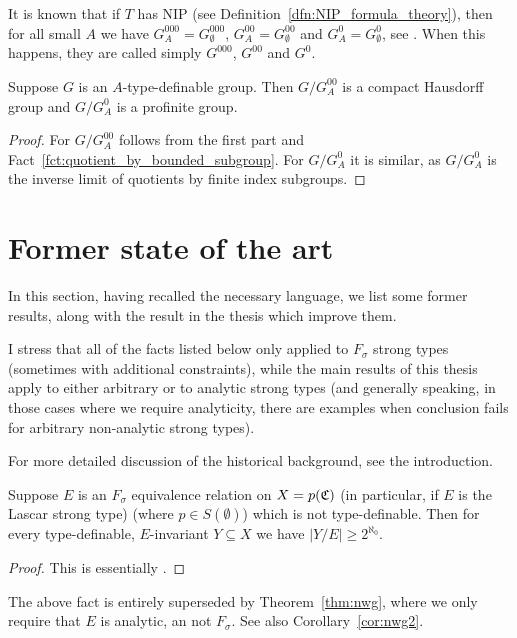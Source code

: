 	\begin{rem}
		It is known that if $T$ has NIP (see Definition~\ref{dfn:NIP_formula_theory}), then for all small $A$ we have $G^{000}_A=G^{000}_\emptyset$, $G^{00}_A=G^{00}_\emptyset$ and $G^{0}_A=G^{0}_\emptyset$, see \cite{Gis11}. When this happens, they are called simply $G^{000}$, $G^{00}$ and $G^{0}$.\xqed{\lozenge}
	\end{rem}
	
	
	\begin{fct}
		Suppose $G$ is an $A$-type-definable group. Then $G/G^{00}_A$ is a compact Hausdorff group and $G/G^{0}_A$ is a profinite group.
	\end{fct}
	\begin{proof}
		For $G/G^{00}_A$ follows from the first part and Fact~\ref{fct:quotient_by_bounded_subgroup}. For $G/G^{0}_A$ it is similar, as $G/G^{0}_A$ is the inverse limit of quotients by finite index subgroups.
	\end{proof}
	
	\section{Former state of the art}
	In this section, having recalled the necessary language, we list some former results, along with the result in the thesis which improve them.
	
	I stress that all of the facts listed below only applied to $F_\sigma$ strong types (sometimes with additional constraints), while the main results of this thesis apply to either arbitrary or to analytic strong types (and generally speaking, in those cases where we require analyticity, there are examples when conclusion fails for arbitrary non-analytic strong types).
	
	For more detailed discussion of the historical background, see the introduction.
	
	
	\begin{fct}
		\label{fct:newelski}
		Suppose $E$ is an $F_\sigma$ equivalence relation on $X=p({\mathfrak C})$ (in particular, if $E$ is the Lascar strong type) (where $p\in S(\emptyset)$) which is not type-definable. Then for every type-definable, $E$-invariant $Y\subseteq X$ we have $\lvert Y/E\rvert\geq 2^{\aleph_0}$.
	\end{fct}
	\begin{proof}
		This is essentially \cite[Corollary 1.12]{Ne03}.
	\end{proof}
	The above fact is entirely superseded by Theorem~\ref{thm:nwg}, where we only require that $E$ is analytic, an not $F_\sigma$. See also Corollary~\ref{cor:nwg2}.
	
